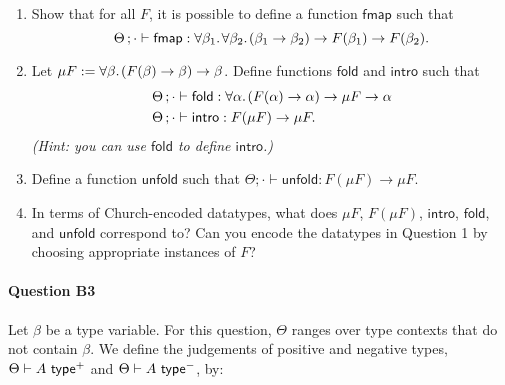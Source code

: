 \documentclass[11pt,a4paper,twoside]{article}
\begin{document}
\begin{enumerate}[label=(\alph*)]
  \item Show that for all $F$, it is possible to define a function $\mathsf{fmap}$ such that
  \[ \Theta \, ; \cdot \vdash \mathsf{fmap} : 
    \forall \beta_1 .\;\! \forall \beta_2 .\;\! (\beta_1 \to \beta_2) \to F(\beta_1) \to F(\beta_2). \]
  
  \item Let $\mu F := \forall \beta .\;\! (F(\beta) \to \beta) \to \beta$.
  Define functions $\mathsf{fold}$ and $\mathsf{intro}$ such that
  \begin{align*}
    \Theta \, ; \cdot &\vdash \mathsf{fold}  : \forall \alpha .\;\! (F(\alpha) \to \alpha) \to \mu F \to \alpha \\
    \Theta \, ; \cdot &\vdash \mathsf{intro} : F(\mu F) \to \mu F.
  \end{align*}
  \emph{(Hint: you can use $\mathsf{fold}$ to define $\mathsf{intro}$.)}

  \item Define a function $\mathsf{unfold}$ such that
    $\Theta \semicolon \cdot \vdash \mathsf{unfold} : F (\mu F) \to \mu F$.

  \item In terms of Church-encoded datatypes, what does $\mu F$, $F(\mu F)$, $\mathsf{intro}$, $\mathsf{fold}$, and $\mathsf{unfold}$ correspond to? Can you encode the datatypes in Question 1 by choosing appropriate instances of $F$?
\end{enumerate}

\paragraph{Question B3} Let $\beta$ be a type variable.
For this question, $\Theta$ ranges over type contexts that do not contain $\beta$.
We define the judgements of positive and negative types, 
$\Theta \vdash A\ \mathsf{type}^+$ and $\Theta \vdash A\ \mathsf{type}^-$, by:
\end{document}
